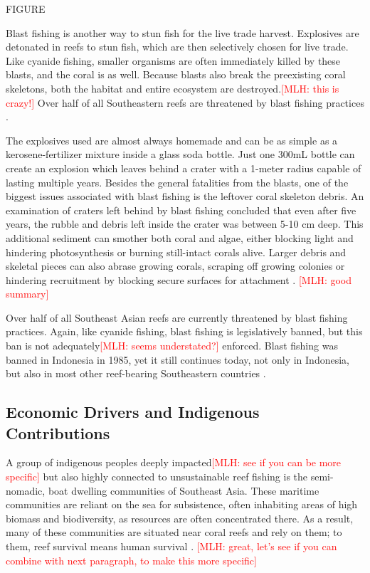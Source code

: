 \documentclass{book}\usepackage{knitr}
\newcommand{\red}[1]{\textcolor{red}{[MLH: #1]}}
\begin{document}
\begin{knitrout}
\begin{kframe}
{FIGURE

Blast fishing is another way to stun fish for the live trade harvest. Explosives are detonated in reefs to stun fish, which are then selectively chosen for live trade. Like cyanide fishing, smaller organisms are often immediately killed by these blasts, and the coral is as well. Because blasts also break the preexisting coral skeletons, both the habitat and entire ecosystem are destroyed.\red{this is crazy!}  Over half of all Southeastern reefs are threatened by blast fishing practices \citep{https://doi.org/10.1890/1051-0761(2006)016[1631:RFBFOC]2.0.CO;2}. 
  
The explosives used are almost always homemade and can be as simple as a kerosene-fertilizer mixture inside a glass soda bottle. Just one 300mL bottle can create an explosion which leaves behind a crater with a 1-meter radius capable of lasting multiple years. Besides the general fatalities from the blasts, one of the biggest issues associated with blast fishing is the leftover coral skeleton debris. An examination of craters left behind by blast fishing concluded that even after five years, the rubble and debris left inside the crater was between 5-10 cm deep. This additional sediment can smother both coral and algae, either blocking light and hindering photosynthesis or burning still-intact corals alive. Larger debris and skeletal pieces can also abrase growing corals, scraping off growing colonies or hindering recruitment by blocking secure surfaces for attachment \citep{https://doi.org/10.1890/1051-0761(2006)016[1631:RFBFOC]2.0.CO;2}. \red{good summary}

Over half of all Southeast Asian reefs are currently threatened by blast fishing practices. Again, like cyanide fishing, blast fishing is legislatively banned, but this ban is not adequately\red{seems understated?} enforced. Blast fishing was banned in Indonesia in 1985, yet it still continues today, not only in Indonesia, but also in most other reef-bearing Southeastern countries \citep{https://doi.org/10.1890/1051-0761(2006)016[1631:RFBFOC]2.0.CO;2}. 


\subsection{Economic Drivers and Indigenous Contributions}

A group of indigenous peoples deeply impacted\red{see if you can be more specific} but also highly connected to unsustainable reef fishing is the semi-nomadic, boat dwelling communities of Southeast Asia. These maritime communities are reliant on the sea for subsistence, often inhabiting areas of high biomass and biodiversity, as resources are often concentrated there. As a result, many of these communities are situated near coral reefs and rely on them; to them, reef survival means human survival \citep{boatpeople}. \red{great, let's see if you can combine with next paragraph, to make this more specific}

}
\end{kframe}
\end{knitrout}
\end{document}
